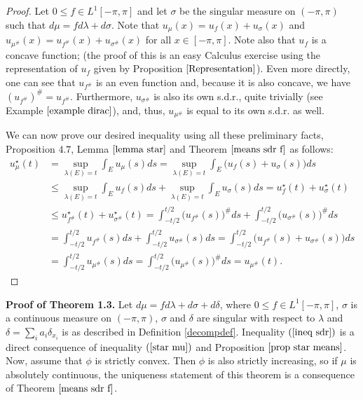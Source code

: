 \documentclass[11pt]{amsart}
\numberwithin{equation}{section}
\begin{document}
\begin{proof}
Let \(0\leq f\in L^1[-\pi,\pi]\) and let \(\sigma\) be the singular measure on \((-\pi,\pi)\) such that \(d\mu=fd\lambda+d\sigma\). Note that \(u_\mu(x)=u_f(x)+u_\sigma(x)\) and \(u_{\mu^\#}(x)=u_{f^\#}(x)+u_{\sigma^\#}(x)\) for all \(x\in[-\pi,\pi]\). Note also that \(u_f\) is a concave function; (the proof of this is an easy Calculus exercise  using the representation of \(u_f\) given by Proposition \(\ref{Representation}\)). Even more directly, one can see that \(u_{f^\#}\) is an even function and, because it is also concave, we have \((u_{f^\#})^\#=u_{f^\#}\). Furthermore, \(u_{\sigma^\#}\) is also its own s.d.r., quite trivially (see Example \(\ref{example dirac}\)), and, thus, \(u_{\mu^\#}\) is equal to its own s.d.r. as well.
\par We can now prove our desired inequality using all these preliminary facts, Proposition \(4.7\), Lemma \(\ref{lemma star}\) and Theorem \(\ref{means sdr f}\) as follows:
\begin{align*}
u_\mu^\star(t)&=\sup_{\lambda(E)=t}\int_E u_\mu(s)ds=\sup_{\lambda(E)=t}\int_E\bigl(u_f(s)+u_\sigma(s)\bigr)ds\\
&\leq\sup_{\lambda(E)=t}\int_Eu_f(s)ds+\sup_{\lambda(E)=t}\int_E u_\sigma(s)ds=u_f^\star(t)+u_\sigma^\star(t)\\
&\leq u^\star_{f^\#}(t)+u^\star_{\sigma^\#}(t)=\int_{-t/2}^{t/2}\bigl(u_{f^\#}(s)\bigr)^\#ds+\int_{-t/2}^{t/2}\bigl(u_{\sigma^\#}(s)\bigr)^\#ds\\
&=\int_{-t/2}^{t/2}u_{f^\#}(s)ds+\int_{-t/2}^{t/2}u_{\sigma^\#}(s)ds=\int_{-t/2}^{t/2}\bigl(u_{f^\#}(s)+u_{\sigma^\#}(s)\bigr)ds\\
&=\int_{-t/2}^{t/2}u_{\mu^\#}(s)ds=\int_{-t/2}^{t/2}\bigl(u_{\mu^\#}(s)\bigr)^\#ds=u_{\mu^\#}(t).
\end{align*}
\end{proof}
\justify
\textbf{Proof of Theorem 1.3.}  Let \(d\mu=fd\lambda+d\sigma+d\delta\), where \(0\leq f\in L^1[-\pi,\pi]\), \(\sigma\) is a continuous measure on \((-\pi,\pi)\), \(\sigma\) and \(\delta\) are singular with respect to \(\lambda\) and \(\delta=\sum_i a_i \delta_{x_i}\) is as described in Definition \ref{decompdef}.
Inequality \((\ref{ineq sdr})\) is a direct consequence of inequality \((\ref{star mu})\) and Proposition \(\ref{prop star means}\).\\
Now, assume that \(\phi\) is strictly convex. Then \(\phi\) is also strictly increasing, so if \(\mu\) is absolutely continuous, the uniqueness statement of this theorem is a consequence of Theorem \(\ref{means sdr f}\).
\end{document}
